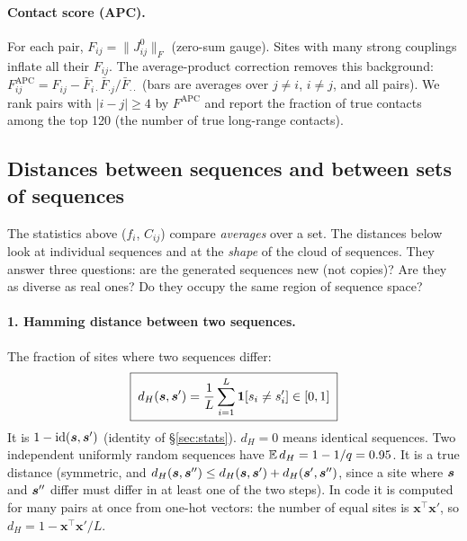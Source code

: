 \paragraph{Contact score (APC).} For each pair, $F_{ij}=\|J^0_{ij}\|_F$ (zero-sum gauge). Sites with many
strong couplings inflate all their $F_{ij}$. The average-product correction removes this background:
$F^{\text{APC}}_{ij}=F_{ij}-\bar F_{i\cdot}\bar F_{\cdot j}/\bar F_{\cdot\cdot}$ (bars are averages over
$j\ne i$, $i\ne j$, and all pairs). We rank pairs with $|i-j|\ge4$ by $F^{\text{APC}}$ and report the
fraction of true contacts among the top 120 (the number of true long-range contacts).

\subsection{Distances between sequences and between sets of sequences}\label{sec:distances}
The statistics above ($f_i$, $C_{ij}$) compare \emph{averages} over a set. The distances below look at
individual sequences and at the \emph{shape} of the cloud of sequences. They answer three questions:
are the generated sequences new (not copies)? Are they as diverse as real ones? Do they occupy the same
region of sequence space?

\paragraph{1. Hamming distance between two sequences.} The fraction of sites where two sequences differ:
\begin{equation}\label{eq:hamming}
\boxed{\;d_H(\bm{s},\bm{s}')=\frac1L\sum_{i=1}^L\mathbf{1}[s_i\neq s'_i]\in[0,1]\;}
\end{equation}
It is $1-\mathrm{id}(\bm{s},\bm{s}')$ (identity of \S\ref{sec:stats}). $d_H=0$ means identical sequences. Two
independent uniformly random sequences have $\mathbb{E}\,d_H=1-1/q=0.95$. It is a true distance (symmetric, and
$d_H(\bm{s},\bm{s}'')\le d_H(\bm{s},\bm{s}')+d_H(\bm{s}',\bm{s}'')$, since a site where $\bm{s}$ and $\bm{s}''$ differ must differ in at least
one of the two steps). In code it is computed for many pairs at once from one-hot vectors: the number of equal
sites is $\bm x^\top\bm x'$, so $d_H=1-\bm x^\top\bm x'/L$.

